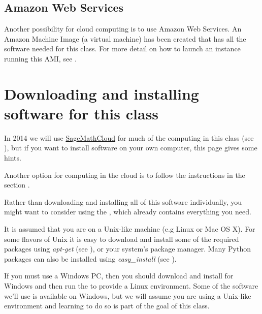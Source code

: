 \documentclass[letterpaper,10pt,english]{sphinxmanual}
\begin{document}
\subsection{Amazon Web Services}
\label{computing_options:amazon-web-services}
Another possibility for cloud computing is to use Amazon Web Services.
An Amazon Machine Image (a virtual machine) has been created that has all
the software needed for this class.  For more detail on how to launch an
instance running this AMI, see {\hyperref[aws:aws]{}}.


\section{Downloading and installing software for this class}
\label{software_installation::doc}\label{software_installation:software-installation}\label{software_installation:downloading-and-installing-software-for-this-class}
In 2014 we will use
\href{https://cloud.sagemath.com/}{SageMathCloud}
for much of the computing in this class (see ), but
if you want to install software on your own computer, this page gives some
hints.

Another option for computing in the cloud is to follow the instructions in
the section {\hyperref[aws:aws]{}}.

Rather than downloading and installing all of this software individually,
you might want to
consider using the {\hyperref[vm:vm]{}}, which already contains everything you need.

It is assumed that you are on a Unix-like machine (e.g Linux or Mac OS
X).  For some flavors of Unix it is easy to download and install some
of the required packages using \emph{apt-get} (see {\hyperref[software_installation:apt\string-get]{}}),
or your system's package
manager.  Many Python packages can also be installed using
\emph{easy\_install} (see {\hyperref[software_installation:easy\string-install]{}}).

If you must use a Windows PC, then you should
download and install \label{software_installation:id1}{\hyperref[biblio:virtualbox]{\crossref{{[}VirtualBox{]}}}} for Windows and then
run the {\hyperref[vm:vm]{}} to provide a Linux environment.  Some of the software
we'll use is available on Windows, but we will assume you are using a
Unix-like environment and learning to do so is part of the goal of this class.
\end{document}

